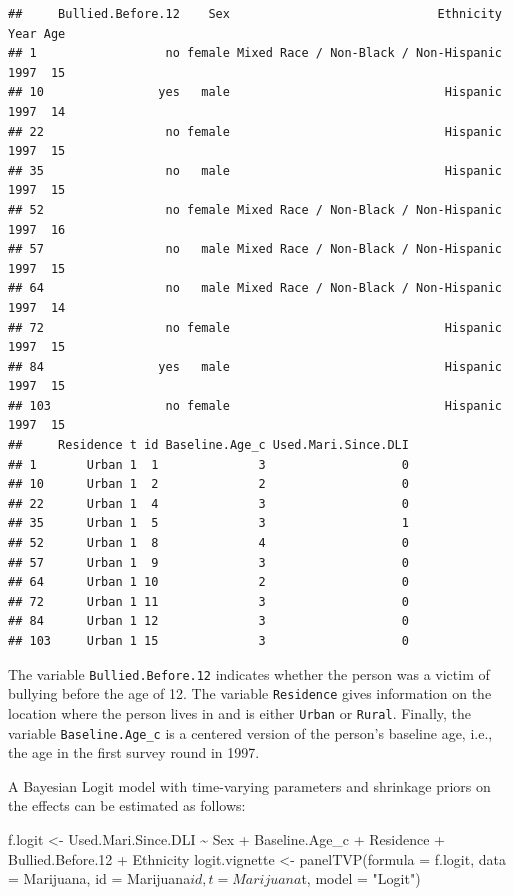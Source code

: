 \documentclass[a4paper, preprint, 3p,
authoryear]{elsarticle} %
\newenvironment{Shaded}{\begin{snugshade}}{\end{snugshade}}
\newcommand{\NormalTok}[1]{#1}
\begin{document}
\begin{verbatim}
##     Bullied.Before.12    Sex                             Ethnicity Year Age
## 1                  no female Mixed Race / Non-Black / Non-Hispanic 1997  15
## 10                yes   male                              Hispanic 1997  14
## 22                 no female                              Hispanic 1997  15
## 35                 no   male                              Hispanic 1997  15
## 52                 no female Mixed Race / Non-Black / Non-Hispanic 1997  16
## 57                 no   male Mixed Race / Non-Black / Non-Hispanic 1997  15
## 64                 no   male Mixed Race / Non-Black / Non-Hispanic 1997  14
## 72                 no female                              Hispanic 1997  15
## 84                yes   male                              Hispanic 1997  15
## 103                no female                              Hispanic 1997  15
##     Residence t id Baseline.Age_c Used.Mari.Since.DLI
## 1       Urban 1  1              3                   0
## 10      Urban 1  2              2                   0
## 22      Urban 1  4              3                   0
## 35      Urban 1  5              3                   1
## 52      Urban 1  8              4                   0
## 57      Urban 1  9              3                   0
## 64      Urban 1 10              2                   0
## 72      Urban 1 11              3                   0
## 84      Urban 1 12              3                   0
## 103     Urban 1 15              3                   0
\end{verbatim}

The variable \texttt{Bullied.Before.12} indicates whether the person was
a victim of bullying before the age of 12. The variable
\texttt{Residence} gives information on the location where the person
lives in and is either \texttt{Urban} or \texttt{Rural}. Finally, the
variable \texttt{Baseline.Age\_c} is a centered version of the person's
baseline age, i.e., the age in the first survey round in 1997.

A Bayesian Logit model with time-varying parameters and shrinkage priors
on the effects can be estimated as follows:

\begin{Shaded}
\begin{Highlighting}[]
\NormalTok{f.logit \textless{}{-} Used.Mari.Since.DLI \textasciitilde{} Sex + Baseline.Age\_c + Residence + Bullied.Before.12 + Ethnicity}
\NormalTok{logit.vignette \textless{}{-} panelTVP(formula = f.logit,}
\NormalTok{                           data = Marijuana,}
\NormalTok{                           id = Marijuana$id,}
\NormalTok{                           t = Marijuana$t,}
\NormalTok{                           model = "Logit")}
\end{Highlighting}
\end{Shaded}
\end{document}
